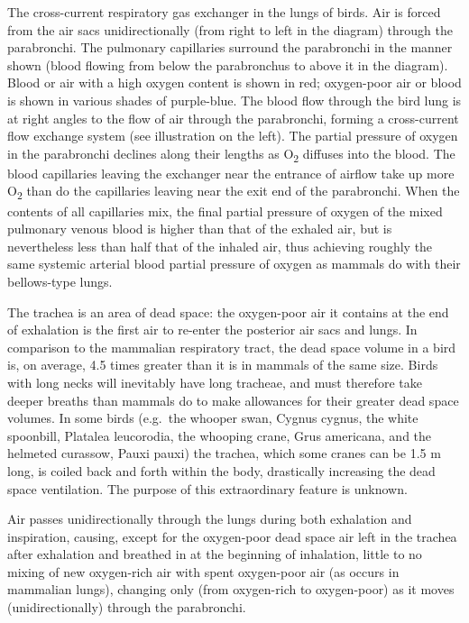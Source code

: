 The cross-current respiratory gas exchanger in the lungs of birds. Air is forced from the air sacs unidirectionally (from right to left in the diagram) through the parabronchi. The pulmonary capillaries surround the parabronchi in the manner shown (blood flowing from below the parabronchus to above it in the diagram). Blood or air with a high oxygen content is shown in red; oxygen-poor air or blood is shown in various shades of purple-blue.
The blood flow through the bird lung is at right angles to the flow of air through the parabronchi, forming a cross-current flow exchange system (see illustration on the left). The partial pressure of oxygen in the parabronchi declines along their lengths as O\textsubscript{2} diffuses into the blood. The blood capillaries leaving the exchanger near the entrance of airflow take up more O\textsubscript{2} than do the capillaries leaving near the exit end of the parabronchi. When the contents of all capillaries mix, the final partial pressure of oxygen of the mixed pulmonary venous blood is higher than that of the exhaled air, but is nevertheless less than half that of the inhaled air, thus achieving roughly the same systemic arterial blood partial pressure of oxygen as mammals do with their bellows-type lungs.

The trachea is an area of dead space: the oxygen-poor air it contains at the end of exhalation is the first air to re-enter the posterior air sacs and lungs. In comparison to the mammalian respiratory tract, the dead space volume in a bird is, on average, 4.5 times greater than it is in mammals of the same size. Birds with long necks will inevitably have long tracheae, and must therefore take deeper breaths than mammals do to make allowances for their greater dead space volumes. In some birds (e.g.~the whooper swan, Cygnus cygnus, the white spoonbill, Platalea leucorodia, the whooping crane, Grus americana, and the helmeted curassow, Pauxi pauxi) the trachea, which some cranes can be 1.5 m long, is coiled back and forth within the body, drastically increasing the dead space ventilation. The purpose of this extraordinary feature is unknown.

Air passes unidirectionally through the lungs during both exhalation and inspiration, causing, except for the oxygen-poor dead space air left in the trachea after exhalation and breathed in at the beginning of inhalation, little to no mixing of new oxygen-rich air with spent oxygen-poor air (as occurs in mammalian lungs), changing only (from oxygen-rich to oxygen-poor) as it moves (unidirectionally) through the parabronchi.

